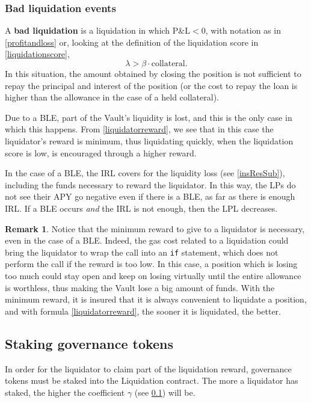 \documentclass[a4paper,10 pt]{article}
\theoremstyle{definition}
\newtheorem{remark}{Remark}
\begin{document}
\subsubsection{Bad liquidation events}\label{bleSubSub}
A {\bf bad liquidation} is a liquidation in which  $\text{P\&L} < 0$, with notation as in \eqref{profitandloss} or, looking at the definition of the liquidation score in \eqref{liquidationscore}, 
$$\lambda > \beta \cdot \text{collateral}.$$ In this situation, the amount obtained by closing the position is not sufficient to repay the principal and interest of the position (or the cost to repay the loan is higher than the allowance in the case of a held collateral).

Due to a BLE, part of the Vault's liquidity is lost, and this is the only case in which this happens. From \eqref{liquidatorreward}, we see that in this case the liquidator's reward is minimum, thus liquidating quickly, when the liquidation score is low, is encouraged through a higher reward.

In the case of a BLE, the IRL covers for the liquidity loss (see \ref{insResSub}), including the funds necessary to reward the liquidator. In this way, the LPs do not see their APY go negative even if there is a BLE, as far as there is enough IRL. If a BLE occurs {\it and} the IRL is not enough, then the LPL decreases.

\begin{remark}\label{nopunishments}
Notice that the minimum reward to give to a liquidator is necessary, even in the case of a BLE. Indeed, the gas cost related to a liquidation could bring the liquidator to wrap the call into an \verb|if| statement, which does not perform the call if the reward is too low. In this case, a position which is losing too much could stay open and keep on losing virtually until the entire allowance is worthless, thus making the Vault lose a big amount of funds. With the minimum reward, it is insured that it is always convenient to liquidate a position, and with formula \eqref{liquidatorreward}, the sooner it is liquidated, the better.
\end{remark} 

\subsection{Staking governance tokens}\label{sgtSub}

In order for the liquidator to claim part of the liquidation reward, governance tokens must be staked into the Liquidation contract. The more a liquidator has staked, the higher the coefficient $\gamma$ (see \ref{sgtSub}) will be.
\end{document}
